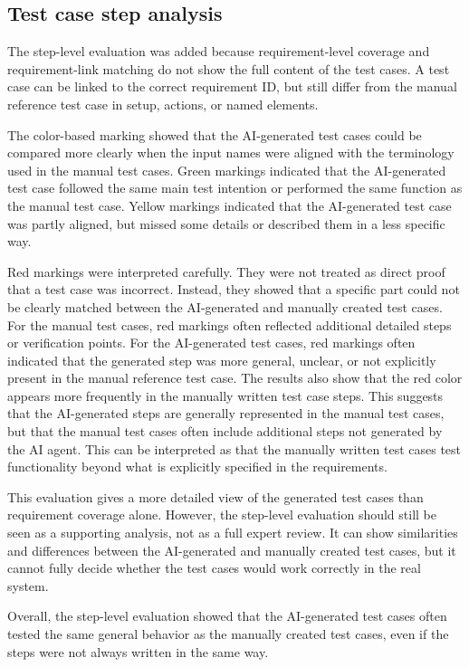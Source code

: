 \documentclass[a4paper,12pt]{article}
\begin{document}
\subsection{Test case step analysis}
The step-level evaluation was added because requirement-level coverage and requirement-link matching do not show the full content of the test cases. A test case can be linked to the correct requirement ID, but still differ from the manual reference test case in setup, actions, or named elements.

The color-based marking showed that the AI-generated test cases could be compared more clearly when the input names were aligned with the terminology used in the manual test cases. Green markings indicated that the AI-generated test case followed the same main test intention or performed the same function as the manual test case. Yellow markings indicated that the AI-generated test case was partly aligned, but missed some details or described them in a less specific way.

Red markings were interpreted carefully. They were not treated as direct proof that a test case was incorrect. Instead, they showed that a specific part could not be clearly matched between the AI-generated and manually created test cases. For the manual test cases, red markings often reflected additional detailed steps or verification points. For the AI-generated test cases, red markings often indicated that the generated step was more general, unclear, or not explicitly present in the manual reference test case. The results also show that the red color appears more frequently in the manually written test case steps. This suggests that the AI-generated steps are generally represented in the manual test cases, but that the manual test cases often include additional steps not generated by the AI agent. This can be interpreted as that the manually written test cases test functionality beyond what is explicitly specified in the requirements.

 This evaluation gives a more detailed view of the generated test cases than requirement coverage alone. However, the step-level evaluation should still be seen as a supporting analysis, not as a full expert review. It can show similarities and differences between the AI-generated and manually created test cases, but it cannot fully decide whether the test cases would work correctly in the real system.

Overall, the step-level evaluation showed that the AI-generated test cases often tested the same general behavior as the manually created test cases, even if the steps were not always written in the same way.
\end{document}
